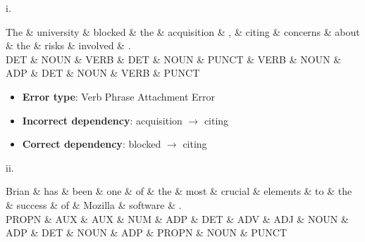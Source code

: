 i. \\
\begin{center}
{

\begin{dependency}[] 
 \begin{deptext}
The \& university \& blocked \& the \& acquisition \& , \& citing \& concerns \& about \& the \& risks \& involved \& . \\
DET \& NOUN \& VERB \& DET \& NOUN \& PUNCT \& VERB \& NOUN \& ADP \& DET \& NOUN \& VERB \& PUNCT \\
\end{deptext}
\end{dependency}
 }
 \end{center}

\ifans{}
\begin{itemize}
    \item \textbf{Error type}: Verb Phrase Attachment Error
    \item \textbf{Incorrect dependency}: acquisition $\rightarrow$ citing
    \item \textbf{Correct dependency}: blocked $\rightarrow$ citing
\end{itemize}


ii. \\
 \begin{center}
 \color{black}
 {\small
 \begin{dependency}
 \begin{deptext}
 Brian \& has \& been \& one \& of  \& the \& most \& crucial \& elements \& to  \& the \& success \& of  \& Mozilla \& software \& .     \\
 PROPN \& AUX \& AUX  \& NUM \& ADP \& DET \& ADV  \& ADJ     \& NOUN     \& ADP \& DET \& NOUN    \& ADP \& PROPN   \& NOUN \& PUNCT \\
 \end{deptext}
 \end{dependency}
 }
 \end{center}

